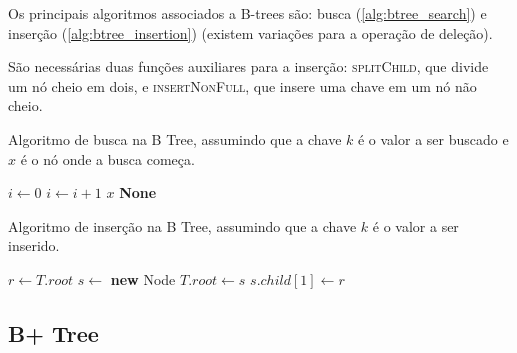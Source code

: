 Os principais algoritmos associados a B-trees são: busca (\cref{alg:btree_search}) e inserção (\cref{alg:btree_insertion}) (existem variações para a operação de deleção).

São necessárias duas funções auxiliares para a inserção: \textsc{splitChild}, que divide um nó cheio em dois, e \textsc{insertNonFull}, que insere uma chave em um nó não cheio.

\begin{algorithm}
\caption{Algoritmo de busca na B Tree, assumindo que a chave $k$ é o valor a ser buscado e $x$ é o nó onde a busca começa.}
\label{alg:btree_search}
\begin{algorithmic}[1]
    \State $i \gets 0$
        \State $i \gets i + 1$
    \EndWhile
        \State \Return $x$
    \EndIf
        \State \Return \textbf{None}
    \EndIf
    \State \Return {}
\EndProcedure
\end{algorithmic}
\end{algorithm}

\begin{algorithm}
\caption{Algoritmo de inserção na B Tree, assumindo que a chave $k$ é o valor a ser inserido.}
\label{alg:btree_insertion}
\begin{algorithmic}[1]
    \State $r \gets T.root$
        \State $s \gets$ \textbf{new} Node
        \State $T.root \gets s$
        \State $s.child[1] \gets r$
        \State {}
        \State {}
    \Else
        \State {}
    \EndIf
\EndProcedure
\end{algorithmic}
\end{algorithm}

\cite{btree:wiki}

\subsection{B+ Tree}

\cite{bptree:wiki}

\printbibliography
